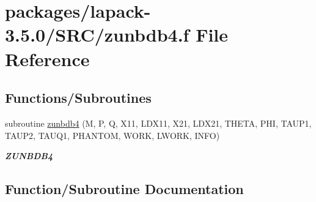 \hypertarget{zunbdb4_8f}{}\section{packages/lapack-\/3.5.0/\+S\+R\+C/zunbdb4.f File Reference}
\label{zunbdb4_8f}
\subsection*{Functions/\+Subroutines}
\begin{DoxyCompactItemize}
\item 
subroutine \hyperlink{zunbdb4_8f_a166f8a34f2daaf6a11db38a2a253186d}{zunbdb4} (M, P, Q, X11, L\+D\+X11, X21, L\+D\+X21, T\+H\+E\+T\+A, P\+H\+I, T\+A\+U\+P1, T\+A\+U\+P2, T\+A\+U\+Q1, P\+H\+A\+N\+T\+O\+M, W\+O\+R\+K, L\+W\+O\+R\+K, I\+N\+F\+O)
\begin{DoxyCompactList}\small\item\em {\bfseries Z\+U\+N\+B\+D\+B4} \end{DoxyCompactList}\end{DoxyCompactItemize}


\subsection{Function/\+Subroutine Documentation}
\hypertarget{zunbdb4_8f_a166f8a34f2daaf6a11db38a2a253186d}{}
